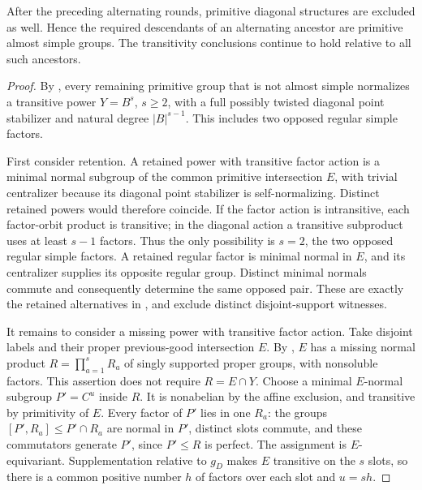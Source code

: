 \begin{lemma}\label{fa:diagonal-exclusion}
After the preceding alternating rounds, primitive diagonal structures are excluded as well.  Hence the
required descendants of an alternating ancestor are primitive almost simple groups.  The transitivity
conclusions continue to hold relative to all such ancestors.
\end{lemma}

\begin{proof}

By , every remaining primitive group that is not almost simple normalizes a
transitive power \(Y=B^s\), \(s\ge2\), with a full possibly twisted diagonal point stabilizer and natural
degree \(|B|^{s-1}\).  This includes two opposed regular simple factors.

First consider retention.  A retained power with transitive factor action is a minimal normal subgroup of
the common primitive intersection \(E\), with trivial centralizer because its diagonal point stabilizer
is self-normalizing.  Distinct retained powers would therefore coincide.  If the factor action is
intransitive, each factor-orbit product is transitive; in the diagonal action a transitive subproduct
uses at least \(s-1\) factors.  Thus the only possibility is \(s=2\), the two opposed regular simple
factors.  A retained regular factor is minimal normal in \(E\), and its centralizer supplies its opposite
regular group.  Distinct minimal normals commute and consequently determine the same opposed pair.  These
are exactly the retained alternatives in , and exclude distinct disjoint-support
witnesses.

It remains to consider a missing power with transitive factor action.  Take disjoint labels and their
proper previous-good intersection \(E\).  By , \(E\) has a missing normal
product \(R=\prod_{a=1}^s R_a\) of singly supported proper groups, with nonsoluble factors.  This
assertion does not require \(R=E\cap Y\).  Choose a minimal \(E\)-normal subgroup \(P'=C^u\) inside
\(R\).  It is nonabelian by the affine exclusion, and transitive by primitivity of \(E\).  Every factor
of \(P'\) lies in one \(R_a\): the groups \([P',R_a]\le P'\cap R_a\) are normal in \(P'\), distinct slots
commute, and these commutators generate \(P'\), since \(P'\le R\) is perfect.  The assignment is
\(E\)-equivariant.  Supplementation relative to \(g_D\) makes \(E\) transitive on the \(s\) slots, so
there is a common positive number \(h\) of factors over each slot and \(u=sh\).


\end{proof}
